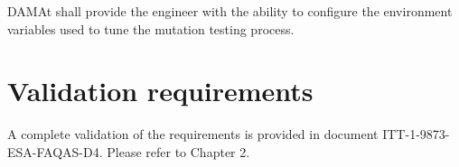 \RQ{} DAMAt shall provide the engineer with the ability to configure the environment variables used to tune the mutation testing process.


\chapter{Validation requirements}

A complete validation of the \FAQAS requirements is provided in document ITT-1-9873-ESA-FAQAS-D4. Please refer to Chapter 2.
